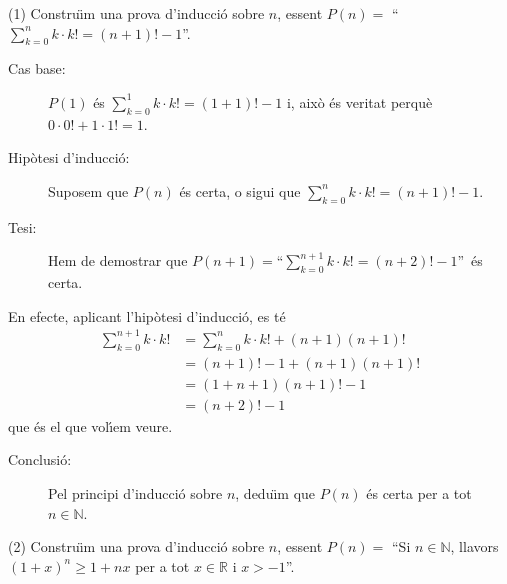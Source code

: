 \begin{solucio}
(1) Constru\"{\i}m una prova d'inducci\'{o} sobre $n$, essent $P(n)=$
\textquotedblleft$%
{\displaystyle\sum\limits_{k=0}^{n}}
k\cdot k!=\left(  n+1\right)  !-1$\textquotedblright.

\begin{description}
\item[Cas base:] $P(1)$ \'{e}s $%
{\displaystyle\sum\limits_{k=0}^{1}}
k\cdot k!=\left(  1+1\right)  !-1$ i, aix\`{o} \'{e}s veritat perqu\`{e}
$0\cdot0!+1\cdot1!=1$.

\item[Hip\`{o}tesi d'inducci\'{o}:] Suposem que $P(n)$ \'{e}s certa, o sigui
que $%
{\displaystyle\sum\limits_{k=0}^{n}}
k\cdot k!=\left(  n+1\right)  !-1$.

\item[Tesi:] Hem de demostrar que $P(n+1)=$\textquotedblleft$%
{\displaystyle\sum\limits_{k=0}^{n+1}}
k\cdot k!=\left(  n+2\right)  !-1$\textquotedblright\ \'{e}s certa.
\end{description}

En efecte, aplicant l'hip\`{o}tesi d'inducci\'{o}, es t\'{e}%
\begin{align*}%
{\displaystyle\sum\limits_{k=0}^{n+1}}
k\cdot k!  &  =%
{\displaystyle\sum\limits_{k=0}^{n}}
k\cdot k!+(n+1)(n+1)!\\
&  =\left(  n+1\right)  !-1+(n+1)(n+1)!\\
&  =(1+n+1)(n+1)!-1\\
&  =(n+2)!-1
\end{align*}
que \'{e}s el que vol\'{\i}em veure.

\begin{description}
\item[Conclusi\'{o}:] Pel principi d'inducci\'{o} sobre $n$, dedu\"{\i}m que
$P(n)$ \'{e}s certa per a tot $n\in\mathbb{N}$.
\end{description}

(2) Constru\"{\i}m una prova d'inducci\'{o} sobre $n$, essent $P(n)=$
\textquotedblleft Si $n\in\mathbb{N}$, llavors $\left(  1+x\right)  ^{n}%
\geq1+nx$ per a tot $x\in\mathbb{R}$ i $x>-1$\textquotedblright.


\end{solucio}
